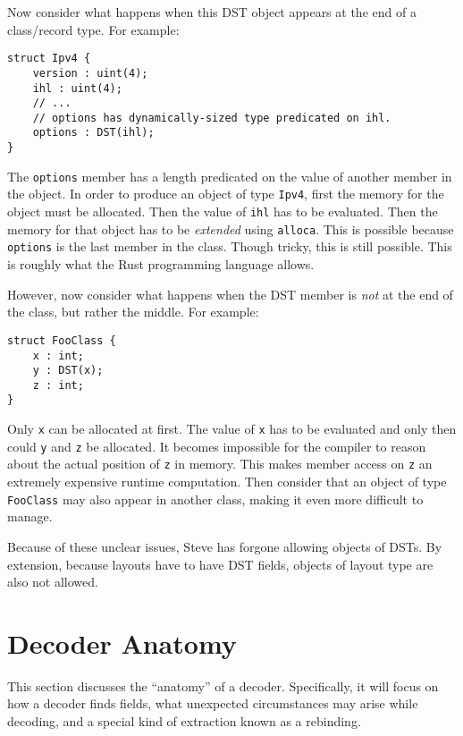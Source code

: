 Now consider what happens when this DST object appears at the end of a class/record
type. For example:

\begin{codepage}
\begin{lstlisting}
struct Ipv4 {
	version : uint(4);
	ihl : uint(4);
	// ...
	// options has dynamically-sized type predicated on ihl.
	options : DST(ihl); 
}
\end{lstlisting}
\end{codepage}

The \texttt{options} member has a length predicated on the value
of another member in the object. In order to produce an object of type \texttt{Ipv4},
first the memory for the object must be allocated. Then the value of \texttt{ihl}
has to be evaluated. Then the memory for that object has to be \emph{extended}
using \texttt{alloca}. This is possible because \texttt{options} is the last member in the class. Though tricky, this is still possible. This is
roughly what the Rust programming language allows.

However, now consider what happens when the DST member is \emph{not} at the end
of the class, but rather the middle. For example:

\begin{codepage}
\begin{lstlisting}
struct FooClass {
	x : int;
	y : DST(x);
	z : int;
}
\end{lstlisting}
\end{codepage}

Only \texttt{x} can be allocated at first. The value of \texttt{x} has to be evaluated
and only then could \texttt{y} and \texttt{z} be allocated. It becomes impossible
for the compiler to reason about the actual position of \texttt{z} in memory. This 
makes member access on \texttt{z} an extremely expensive runtime computation.
Then consider that an object of type \texttt{FooClass} may also appear in
another class, making it even more difficult to manage.

Because of these unclear issues, Steve has forgone allowing objects of DSTs.
By extension, because layouts have to have DST fields, objects of layout type
are also not allowed.


\section{Decoder Anatomy} \label{decoder_anatomy}

This section discusses the ``anatomy'' of a decoder.
Specifically, it will focus on how a decoder finds fields, what unexpected circumstances
may arise while decoding, and a special kind of extraction known
as a rebinding.


